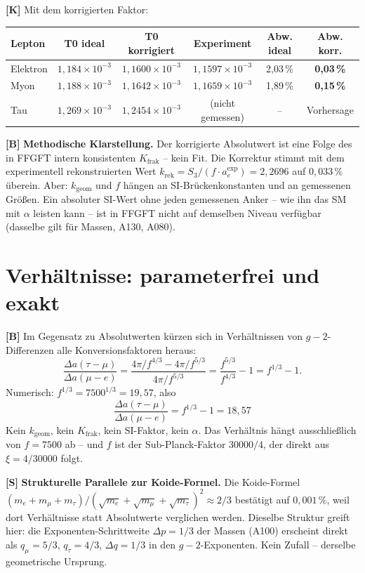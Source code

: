 \textbf{[K]} Mit dem korrigierten Faktor:

\begin{center}
\renewcommand{\arraystretch}{1.3}
{\small
\begin{tabular}{lccccc}
\toprule
Lepton & T0 ideal & T0 korrigiert & Experiment & Abw. ideal & Abw. korr. \\
\midrule
Elektron & $1{,}184\times10^{-3}$ & $1{,}1600\times10^{-3}$ & $1{,}1597\times10^{-3}$ & 2{,}03\,\% & \textbf{0{,}03\,\%} \\
Myon     & $1{,}188\times10^{-3}$ & $1{,}1642\times10^{-3}$ & $1{,}1659\times10^{-3}$ & 1{,}89\,\% & \textbf{0{,}15\,\%} \\
Tau      & $1{,}269\times10^{-3}$ & $1{,}2454\times10^{-3}$ & (nicht gemessen)         & --         & Vorhersage \\
\bottomrule
\end{tabular}
}
\renewcommand{\arraystretch}{1.0}
\end{center}

\textbf{[B]} \textbf{Methodische Klarstellung.} Der korrigierte Absolutwert
ist eine Folge des in FFGFT intern konsistenten $K_\text{frak}$ -- kein Fit.
Die Korrektur stimmt mit dem experimentell rekonstruierten Wert
$k_\text{rek}=S_3/(f\cdot a_e^\text{exp})=2{,}2696$ auf $0{,}033\,\%$ überein.
Aber: $k_\text{geom}$ und $f$ hängen an SI-Brückenkonstanten und an gemessenen
Größen. Ein absoluter SI-Wert ohne jeden gemessenen Anker -- wie ihn das SM mit
$\alpha$ leisten kann -- ist in FFGFT nicht auf demselben Niveau verfügbar
(dasselbe gilt für Massen, A130, A080).

\section{Verhältnisse: parameterfrei und exakt}

\textbf{[B]} Im Gegensatz zu Absolutwerten kürzen sich in Verhältnissen von
$g-2$-Differenzen alle Konversionsfaktoren heraus:
\[
  \frac{\Delta a(\tau-\mu)}{\Delta a(\mu-e)}
  = \frac{4\pi/f^{4/3}-4\pi/f^{5/3}}{4\pi/f^{5/3}}
  = \frac{f^{5/3}}{f^{4/3}} - 1
  = f^{1/3} - 1.
\]
Numerisch: $f^{1/3}=7500^{1/3}=19{,}57$, also
\[
  \boxed{\;\frac{\Delta a(\tau-\mu)}{\Delta a(\mu-e)} = f^{1/3}-1 = 18{,}57\;}
\]
Kein $k_\text{geom}$, kein $K_\text{frak}$, kein SI-Faktor, kein $\alpha$.
Das Verhältnis hängt ausschließlich von $f=7500$ ab -- und $f$ ist der
Sub-Planck-Faktor $30000/4$, der direkt aus $\xi=4/30000$ folgt.

\textbf{[S]} \textbf{Strukturelle Parallele zur Koide-Formel.} Die Koide-Formel
$(m_e+m_\mu+m_\tau)/(\sqrt{m_e}+\sqrt{m_\mu}+\sqrt{m_\tau})^2\approx2/3$
bestätigt auf $0{,}001\,\%$, weil dort Verhältnisse statt Absolutwerte
verglichen werden. Dieselbe Struktur greift hier: die Exponenten-Schrittweite
$\Delta p=1/3$ der Massen (A100) erscheint direkt als $q_\mu=5/3$,
$q_\tau=4/3$, $\Delta q=1/3$ in den $g-2$-Exponenten. Kein Zufall --
derselbe geometrische Ursprung.

